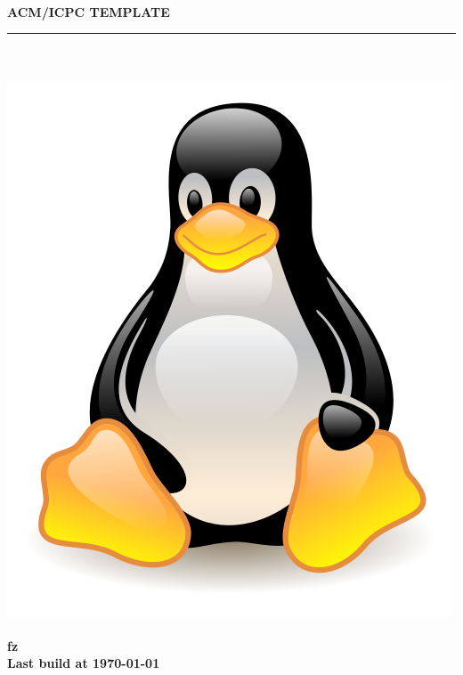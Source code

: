 \begin{titlepage}
	\pagestyle{empty}
	
  \begin{center}
		~\\[80pt]
    \fontsize{40pt}{\baselineskip}\selectfont  \textsc{\textbf{ACM/ICPC TEMPLATE}}\\[32pt]
    \rule{\textwidth}{2pt}\ \\[8pt]
    ~\\[20pt]
    \includegraphics[scale=.7]{./cover.png}
    ~\\[20pt]
    \Huge\textbf{fz}\\[14pt]
    \Large\textbf{Last build at \today}
  \end{center}
\end{titlepage}
\restoregeometry

